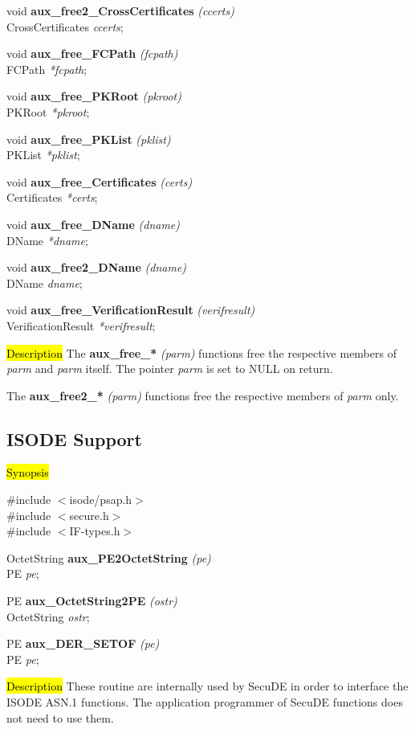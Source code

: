 void {\bf aux\_free2\_CrossCertificates} {\em (ccerts)} \\
CrossCertificates {\em *ccerts};

void {\bf aux\_free\_FCPath} {\em (fcpath)} \\
FCPath {\em **fcpath};

void {\bf aux\_free\_PKRoot} {\em (pkroot)} \\
PKRoot {\em **pkroot};

void {\bf aux\_free\_PKList} {\em (pklist)} \\
PKList {\em **pklist};

void {\bf aux\_free\_Certificates} {\em (certs)} \\
Certificates {\em **certs};

void {\bf aux\_free\_DName} {\em (dname)} \\
DName {\em **dname};

void {\bf aux\_free2\_DName} {\em (dname)} \\
DName {\em *dname};

void {\bf aux\_free\_VerificationResult} {\em (verifresult)} \\
VerificationResult {\em **verifresult};

\hl{Description}
The {\bf aux\_free\_*} {\em (parm)} functions free the respective members of {\em *parm}
and {\em *parm} itself. The pointer {\em *parm} is set to NULL on return.

The {\bf aux\_free2\_*} {\em (parm)} functions free the respective members of {\em parm}
only.

\subsection{ISODE Support}
\label{aux_isode}
\hl{Synopsis}

\#include $<$isode/psap.h$>$ \\
\#include $<$secure.h$>$ \\
\#include $<$IF-types.h$>$ 

OctetString {\bf *aux\_PE2OctetString} {\em  (pe)} \\
PE {\em pe};

PE {\bf aux\_OctetString2PE} {\em (ostr)} \\
OctetString {\em *ostr};

PE {\bf *aux\_DER\_SETOF} {\em  (pe)} \\
PE {\em pe};

\hl{Description}
These routine are internally used by SecuDE in order to interface
the ISODE ASN.1 functions. The application programmer of SecuDE functions
does not need to use them.

